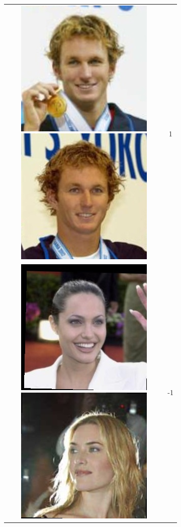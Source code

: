 \documentclass[twoside,11pt]{article}
\begin{document}
\begin{figure}[H]
\begin{subfigure}[t]{0.3\textwidth}
\begin{tabular}{c|c}
\includegraphics[scale=0.15]{Aaron_Peirsol_0001.jpg} \includegraphics[scale=0.15]{Aaron_Peirsol_0002.jpg} & 1\\  \includegraphics[scale=0.15]{Angelina_Jolie_0001.jpg}   \includegraphics[scale=0.15]{Kate_Winslet_0001.jpg} & -1 \\
\end{tabular}
     \caption{}
     \label{fig:pairs}
  \end{subfigure}
  \hspace{5pt}
  \begin{subfigure}[t]{0.3\textwidth}
     \centering 
     

\end{subfigure}
\end{figure}
\end{document}
